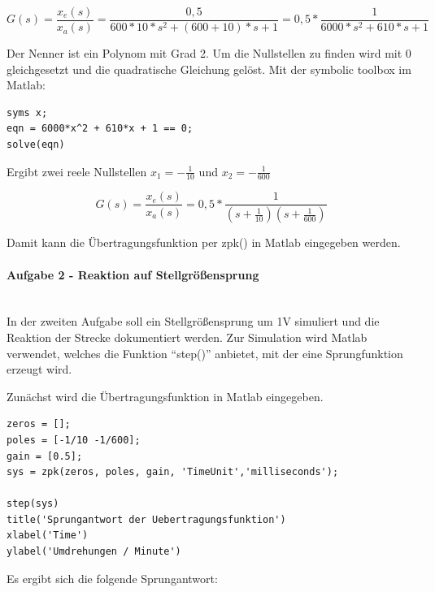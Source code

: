 \documentclass[            %
draft = false,             		%
paper = A4,                		%
pagesize = pdftex,         		%
fontsize = 10pt,           		%
DIV=15,                    		%
twoside = false,           		%
twocolumn = false,         		%
parskip = full,           		%
chapterprefix = false,      		%
appendixprefix = true,     		%
headinclude = false,       		%
footinclude = false,       		%
mpinclude = false,         		%
numbers = auto,            		%
cleardoublepage = plain,   		%
footnotes = multiple,      		%
titlepage = true,          		%
headings = normal,         		%
open = right,              		%
bibliography = openstyle,  		%
listof = chaptergapline,   		%
overfullrule = true,
]{scrbook}
\begin{document}
\begin{equation}
G(s) = \frac{x_e(s)}{x_a(s)} = \frac{0,5}{600*10*s^2 + (600 + 10)*s + 1} = 0,5*\frac{1}{6000*s^2 + 610*s + 1}
\end{equation}

Der Nenner ist ein Polynom mit Grad 2. Um die Nullstellen zu finden wird mit 0 gleichgesetzt und die quadratische Gleichung gelöst.
Mit der symbolic toolbox im Matlab:

\begin{lstlisting}[style=CStyle]
syms x;
eqn = 6000*x^2 + 610*x + 1 == 0;
solve(eqn)
\end{lstlisting}

Ergibt zwei reele Nullstellen $x_1 = - \frac{1}{10}$ und $x_2 = - \frac{1}{600}$

\begin{equation}
G(s) = \frac{x_e(s)}{x_a(s)} = 0,5*\frac{1}{(s + \frac{1}{10})(s + \frac{1}{600})}
\end{equation}

Damit kann die Übertragungsfunktion per zpk() in Matlab eingegeben werden.






\paragraph{Aufgabe 2 - Reaktion auf Stellgrößensprung}~\\

In der zweiten Aufgabe soll ein Stellgrößensprung um 1V simuliert und die Reaktion der Strecke dokumentiert werden.
Zur Simulation wird Matlab verwendet, welches die Funktion ``step()'' anbietet, mit der eine Sprungfunktion erzeugt wird.

Zunächst wird die Übertragungsfunktion in Matlab eingegeben.

\begin{lstlisting}[style=CStyle]
zeros = [];
poles = [-1/10 -1/600];
gain = [0.5];
sys = zpk(zeros, poles, gain, 'TimeUnit','milliseconds');

step(sys)
title('Sprungantwort der Uebertragungsfunktion')
xlabel('Time') 
ylabel('Umdrehungen / Minute') 
\end{lstlisting}

Es ergibt sich die folgende Sprungantwort:
\end{document}

